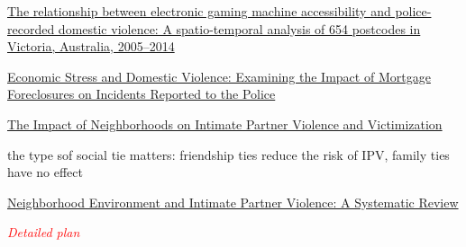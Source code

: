 \documentclass[11pt, a4paper]{article}
\begin{document}
\href{https://www.sciencedirect.com/science/article/abs/pii/S0277953616302891}{The relationship between electronic gaming machine accessibility and police-recorded domestic violence: A spatio-temporal analysis of 654 postcodes in Victoria, Australia, 2005–2014}

\href{https://journals.sagepub.com/doi/abs/10.1177/1525107115623938}{Economic Stress and Domestic Violence: Examining the Impact of Mortgage Foreclosures on Incidents Reported to the Police }

\href{https://journals.sagepub.com/doi/abs/10.1177/1524838012445641?journalCode=tvaa}{
The Impact of Neighborhoods on Intimate Partner Violence and Victimization
}

the type sof social tie matters: friendship ties reduce the risk of IPV, family ties have no effect

\href{https://journals.sagepub.com/doi/abs/10.1177/1524838013515758}{Neighborhood Environment and Intimate Partner Violence: A Systematic Review }

\textcolor{red}{\textit{Detailed plan}}
\end{document}
